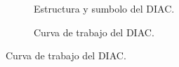         \begin{figure}[H]
            \centering
            \begin{subfigure}[ht]{0.48\textwidth}
              \caption{Estructura y sumbolo del DIAC.}
              \label{fig:EstrucDiac}
            \end{subfigure}
            \hfill 
            \begin{subfigure}[ht]{0.48\textwidth}
              \caption{Curva de trabajo del DIAC.}
              \label{fig:CurvaDiac}
            \end{subfigure}
        \end{figure}

